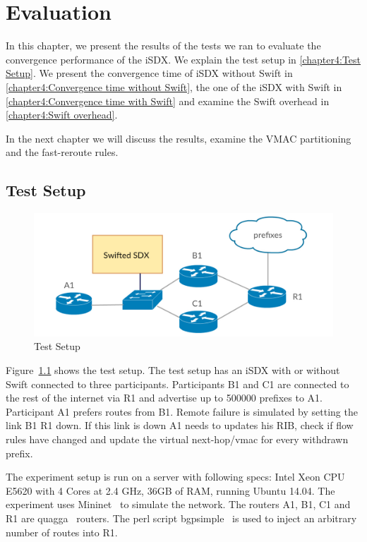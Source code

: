 \chapter{\label{chapter4}Evaluation}

In this chapter, we present the results of the tests we ran to evaluate the convergence performance of the iSDX. We explain the test setup in \ref{chapter4:Test Setup}. We present the convergence time of iSDX without Swift in \ref{chapter4:Convergence time without Swift}, the one of the iSDX with Swift in \ref{chapter4:Convergence time with Swift} and examine the Swift overhead in \ref{chapter4:Swift overhead}.

In the next chapter we will discuss the results, examine the VMAC partitioning and the fast-reroute rules.

\section{\label{chapter4:Test Setup}Test Setup}

\begin{figure}[h]
\center
\includegraphics[scale = 0.36]{Figures/eval_exp_setup.pdf}
\caption{Test Setup}
\label{fig:test-setup}
\end{figure}

Figure~\ref{fig:test-setup} shows the test setup.
The test setup has an iSDX with or without Swift connected to three participants. Participants B1 and C1 are connected to the rest of the internet via R1 and advertise up to 500000 prefixes to A1. Participant A1 prefers routes from B1. Remote failure is simulated by setting the link B1 R1 down. If this link is down A1 needs to updates his RIB, check if flow rules have changed and update the virtual next-hop/vmac for every withdrawn prefix.

The experiment setup is run on a server with following specs: Intel Xeon CPU E5620 with 4 Cores at 2.4 GHz, 36GB of RAM, running Ubuntu 14.04. The experiment uses Mininet~\cite{mininet} to simulate the network. The routers A1, B1, C1 and R1 are quagga~\cite{quagga} routers. The perl script bgpsimple~\cite{bgpsimple} is used to inject an arbitrary number of routes into R1. 

